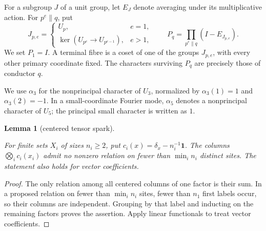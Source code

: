 \documentclass[11pt]{amsart}
\numberwithin{theorem}{section}
\newtheorem{lemma}[theorem]{Lemma}
\theoremstyle{remark}
\numberwithin{equation}{section}
\begin{document}
For a subgroup \(J\) of a unit group, let \(E_J\) denote averaging under
its multiplicative action. For \(p^e\parallel q\), put
\[
J_{p,e}=\begin{cases}
U_p,&e=1,\\
\ker(U_{p^e}\to U_{p^{e-1}}),&e>1,
\end{cases}
\qquad
P_q=\prod_{p^e\parallel q}(I-E_{J_{p,e}}).
\]
We set \(P_1=I\). A terminal fibre is a coset of one of the groups
\(J_{p,e}\), with every other primary coordinate fixed. The characters
surviving \(P_q\) are precisely those of conductor \(q\).

We use \(\alpha_3\) for the nonprincipal character of \(U_3\),
normalized by \(\alpha_3(1)=1\) and \(\alpha_3(2)=-1\).
In a small-coordinate Fourier mode, \(\alpha_5\) denotes a
nonprincipal character of \(U_5\); the principal small character
is written as \(1\).

\begin{lemma}[centered tensor spark]\label{lemma:2.1}

For finite sets \(X_i\) of sizes \(n_i\ge2\), put
\(c_i(x)=\delta_x-n_i^{-1}\mathbf1\). The columns
\(\bigotimes_i c_i(x_i)\) admit no nonzero relation on fewer than
\(\min_i n_i\) distinct sites. The statement also holds for vector
coefficients.

\end{lemma}
\begin{proof}

The only relation among all centered columns of one factor is their sum.
In a proposed relation on fewer than \(\min_i n_i\) sites, fewer than
\(n_1\) first labels occur, so their columns are independent. Grouping by
that label and inducting on the remaining factors proves the assertion.
Apply linear functionals to treat vector coefficients.
\end{proof}
\end{document}
